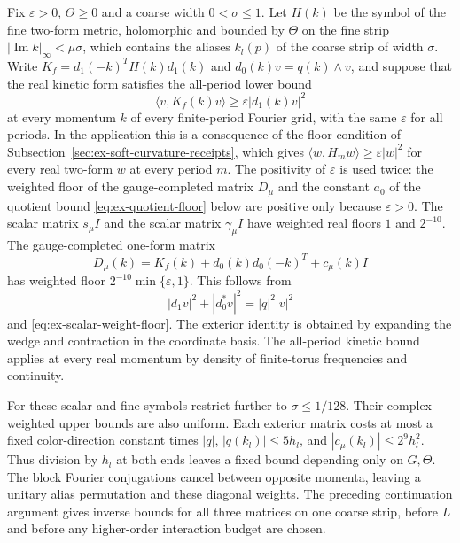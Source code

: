 Fix $\varepsilon>0$, $\Theta\geq0$ and a coarse width
$0<\sigma\leq1$. Let $H(k)$ be the symbol of the fine two-form metric,
holomorphic and bounded by $\Theta$ on the fine strip
$|\operatorname{Im}k|_\infty<\mu\sigma$, which contains the aliases
$k_l(p)$ of the coarse strip of width $\sigma$. Write
$K_f=d_1(-k)^TH(k)d_1(k)$ and $d_0(k)v=q(k)\wedge v$, and suppose that
the real kinetic form satisfies the all-period lower bound
\[
        \langle v,K_f(k)v\rangle\geq\varepsilon|d_1(k)v|^2
\]
at every momentum $k$ of every finite-period Fourier grid, with the same
$\varepsilon$ for all periods. In the application this is a consequence
of the floor condition of Subsection~\ref{sec:ex-soft-curvature-receipts},
which gives $\langle w,H_mw\rangle\geq\varepsilon|w|^2$ for every real
two-form $w$ at every period $m$. The positivity of $\varepsilon$ is
used twice: the weighted floor of the gauge-completed matrix $D_\mu$
and the constant $a_0$ of the quotient bound
\eqref{eq:ex-quotient-floor} below are positive only because
$\varepsilon>0$.
The scalar matrix $s_\mu I$ and the scalar matrix $\gamma_\mu I$
have weighted real floors $1$ and $2^{-10}$. The gauge-completed
one-form matrix
\[
       D_\mu(k)=K_f(k)+d_0(k)d_0(-k)^T+c_\mu(k)I
\]
has weighted floor $2^{-10}\min\{\varepsilon,1\}$.
This follows from
\[
       |d_1v|^2+|d_0^*v|^2=|q|^2|v|^2
\]
and \eqref{eq:ex-scalar-weight-floor}. The exterior identity is obtained
by expanding the wedge and contraction in the coordinate basis.
The all-period kinetic bound applies at every real momentum by density
of finite-torus frequencies and continuity.

For these scalar and fine symbols restrict further to $\sigma\leq1/128$.
Their complex weighted upper bounds are also uniform. Each exterior
matrix costs at most a fixed color-direction constant times $|q|$,
$|q(k_l)|\leq5h_l$, and $|c_\mu(k_l)|\leq2^9h_l^2$.
Thus division by $h_l$ at both ends leaves a fixed bound depending only
on $G,\Theta$. The block Fourier conjugations cancel between opposite
momenta, leaving a unitary alias permutation and these diagonal weights.
The preceding continuation argument gives inverse bounds for all three
matrices on one coarse strip, before $L$ and before any higher-order
interaction budget are chosen.

